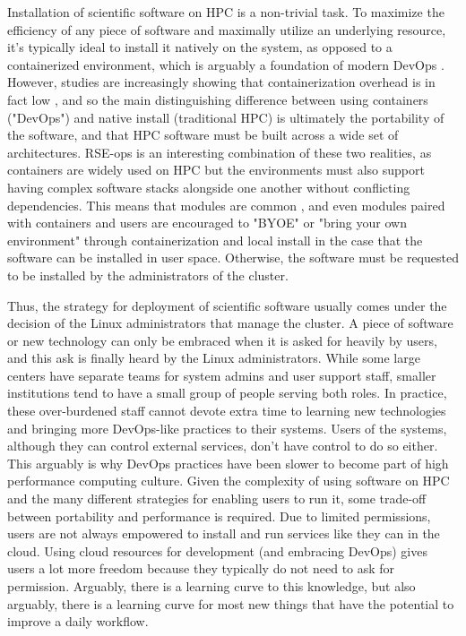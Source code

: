 Installation of scientific software on HPC is a non-trivial task. To maximize the efficiency of any piece of software and maximally utilize an underlying resource, it's typically ideal to install it natively on the system, as opposed to a containerized environment, which is arguably a foundation of modern DevOps \cite{containers-intro}. However, studies are increasingly showing that containerization overhead is in fact low \cite{Torrez2019-ho}, and so the main distinguishing difference between using containers ("DevOps") and native install (traditional HPC) is ultimately the portability of the software, and that HPC software must be built across a wide set of architectures. RSE-ops is an interesting combination of these two realities, as containers are widely used on HPC \cite{singularity,charlie,podman} but the environments must also support having complex software stacks alongside one another without conflicting dependencies. This means that modules are common \cite{LMOD,environment-modules}, and even modules paired with containers \cite{shpc} and users are encouraged to "BYOE" or "bring your own environment" through containerization and local install in the case that the software can be installed in user space. Otherwise, the software must be requested to be installed by the administrators of the cluster.

Thus, the strategy for deployment of scientific software usually comes under the decision of the Linux administrators that manage the cluster. A piece of software or new technology can only be embraced when it is asked for heavily by users, and this ask is finally heard by the Linux administrators. While some large centers have separate teams for system admins and user support staff, smaller institutions tend to have a small group of people serving both roles. In practice, these over-burdened staff cannot devote extra time to learning new technologies and bringing more DevOps-like practices to their systems. Users of the systems, although they can control external services, don't have control to do so either. This arguably is why DevOps practices have been slower to become part of high performance computing culture. Given the complexity of using software on HPC and the many different strategies for enabling users to run it, some trade-off between portability and performance is required. Due to limited permissions, users are not always empowered to install and run services like they can in the cloud. Using cloud resources for development (and embracing DevOps) gives users a lot more freedom because they typically do not need to ask for permission. Arguably, there is a learning curve to this knowledge, but also arguably, there is a learning curve for most new things that have the potential to improve a daily workflow.

